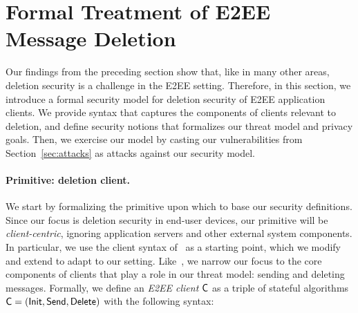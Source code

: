 \section{Formal Treatment of E2EE Message Deletion}\label{sec:security-definition}
Our findings from the preceding section show that, like in many other areas, deletion security is a challenge in the E2EE setting. Therefore, in this section, we introduce a formal security model for deletion security of E2EE application clients. We provide syntax that captures the components of clients relevant to deletion, and define security notions that formalizes our threat model and privacy goals. Then, we exercise our model by casting our vulnerabilities from Section~\ref{sec:attacks} as attacks against our security model.

\paragraph{Primitive: deletion client.} We start by formalizing the primitive upon which to base our security definitions. Since our focus is deletion security in end-user devices, our primitive will be \emph{client-centric}, ignoring application servers and other external system components. In particular, we use the client syntax of~\cite{fabrega2025mitigating} as a starting point, which we modify and extend to adapt to our setting. Like~\cite{fabrega2025mitigating}, we narrow our focus to the core components of clients that play a role in our threat model: sending and deleting messages. Formally, we define an \emph{E2EE client} $\mathsf{C}$ as a triple of stateful algorithms $\mathsf{C} = (\mathsf{Init}, \mathsf{Send}, \mathsf{Delete})$ with the following syntax:

